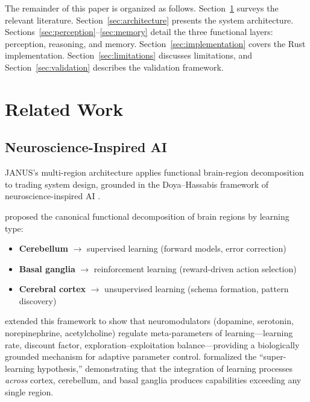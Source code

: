 \documentclass[12pt, a4paper]{article}
\begin{document}
The remainder of this paper is organized as follows. Section~\ref{sec:related_work} surveys the relevant literature. Section~\ref{sec:architecture} presents the system architecture. Sections~\ref{sec:perception}--\ref{sec:memory} detail the three functional layers: perception, reasoning, and memory. Section~\ref{sec:implementation} covers the Rust implementation. Section~\ref{sec:limitations} discusses limitations, and Section~\ref{sec:validation} describes the validation framework.

\section{Related Work}
\label{sec:related_work}

\subsection{Neuroscience-Inspired AI}
\label{sec:rw_neuroscience}

JANUS's multi-region architecture applies functional brain-region decomposition to trading system design, grounded in the Doya--Hassabis framework of neuroscience-inspired AI \citep{doya1999computations, hassabis2017neuroscience}.

\citet{doya1999computations} proposed the canonical functional decomposition of brain regions by learning type:

\begin{itemize}
	\item \textbf{Cerebellum} $\rightarrow$ supervised learning (forward models, error correction)
	\item \textbf{Basal ganglia} $\rightarrow$ reinforcement learning (reward-driven action selection)
	\item \textbf{Cerebral cortex} $\rightarrow$ unsupervised learning (schema formation, pattern discovery)
\end{itemize}

\citet{doya2002metalearning} extended this framework to show that neuromodulators (dopamine, serotonin, norepinephrine, acetylcholine) regulate meta-parameters of learning---learning rate, discount factor, exploration--exploitation balance---providing a biologically grounded mechanism for adaptive parameter control. \citet{caligiore2019superlearning} formalized the ``super-learning hypothesis,'' demonstrating that the integration of learning processes \textit{across} cortex, cerebellum, and basal ganglia produces capabilities exceeding any single region.
\end{document}
